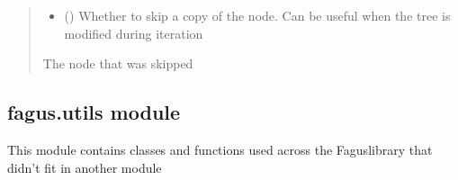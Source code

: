 \documentclass[a4paper,10pt,english]{sphinxmanual}
\begin{document}
\begin{fulllineitems}
\begin{fulllineitems}
\begin{quote}
\begin{description}
\begin{itemize}
\item {}
\sphinxAtStartPar
{} () \textendash{} Whether to skip a copy of the node. Can be useful when the tree is modified during iteration

\end{itemize}

\sphinxAtStartPar
The node that was skipped

\end{description}\end{quote}

\end{fulllineitems}


\end{fulllineitems}


\sphinxstepscope


\subsection{fagus.utils module}
\label{\detokenize{fagus.utils:module-fagus.utils}}\label{\detokenize{fagus.utils:fagus-utils-module}}\label{\detokenize{fagus.utils::doc}}
\sphinxAtStartPar
This module contains classes and functions used across the Fagus\sphinxhyphen{}library that didn’t fit in another module
\end{document}
